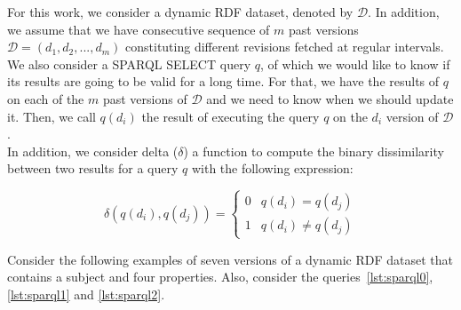 \documentclass[runningheads]{llncs}
\begin{document}
For this work, we consider a dynamic RDF dataset, denoted by $\mathcal{D}$. In addition, we assume that we have consecutive sequence of $m$ past versions $\mathcal{D} = (d_1, d_2, ..., d_m)$ constituting different revisions fetched at regular intervals. We also consider a SPARQL SELECT query $q$, of which we would like to know if its results are going to be valid for a long time. For that, we have the results of $q$ on each of the $m$ past versions of $\mathcal{D}$ and we need to know when we should update it. Then, we call $q(d_i)$ the result of executing the query $q$ on the $d_i$ version of $\mathcal{D}$.\\

In addition, we consider delta ($\delta$) a function to compute the binary dissimilarity between two results for a query $q$ with the following expression:

\begin{equation}
\label{eq:delta}
\delta(q(d_i), q(d_j)) = \begin{cases}
0 & q(d_i) = q(d_j) \\
1 & q(d_i) \neq q(d_j) 
\end{cases}
\end{equation}

\begin{example}
	\label{ex:dataset}    
	Consider the following examples of seven versions of a dynamic RDF dataset that contains a subject and four properties. Also, consider the queries~\ref{lst:sparql0}, \ref{lst:sparql1} and \ref{lst:sparql2}.
\end{example}
\end{document}
